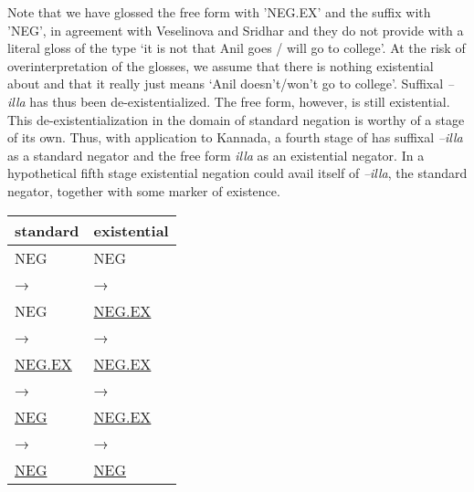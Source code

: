 ﻿\documentclass[output=paper]{langsci/langscibook}
\begin{document}
%
Note that we have glossed the free form with 'NEG.EX' and
the suffix with 'NEG', in agreement with Veselinova and
Sridhar and they do not  provide  with a literal gloss of
the type `it is not that Anil goes \slash{} will go to college'. At the risk of
overinterpretation of the glosses, we assume that there is nothing
existential about  and that it really just means `Anil
doesn't\slash{}won't go to college'. Suffixal \textit{–illa} has thus been
de-existentialized. The free form, however, is still existential. This
de-existentialization in the domain of standard negation is worthy of a
stage of its own. Thus, with application to Kannada, a fourth stage of
 has suffixal \textit{–illa} as a standard negator and the
free form \textit{illa} as an existential negator. In a hypothetical fifth
stage existential negation could avail itself of \textit{–illa}, the
standard negator, together with some marker of existence.
%
\begin{exe}\begin{small}\ex\label{ex:int-fourth-stage}\begin{tabularx}{.5\textwidth}[t]{Q Q}
          standard & existential\\\midrule
        NEG                 &NEG            \\
→ & → \\
        NEG             &\underline{NEG.EX}  \\
→ & → \\
        \underline{NEG.EX}   &\underline{NEG.EX}  \\
→ & → \\
        \underline{NEG}   &\underline{NEG.EX}  \\
→ & → \\
        \underline{NEG}   &\underline{NEG}  
\end{tabularx}\end{small}\end{exe}
\end{document}
